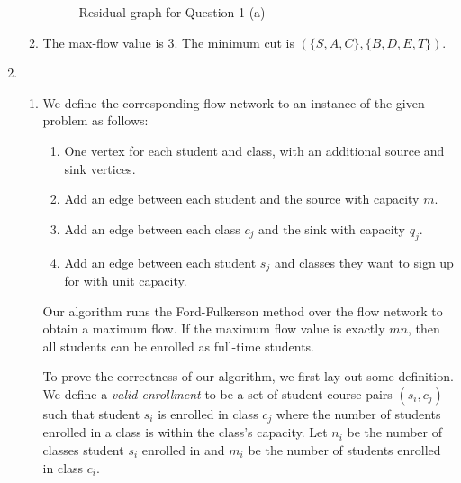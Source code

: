 \documentclass{article}
\begin{document}
\begin{enumerate}
\begin{enumerate}
\begin{figure}[ht]
            \caption{Residual graph for Question 1 (a)}
            \label{fig:1a}
        \end{figure}
        
        \item The max-flow value is 3. The minimum cut is $(\{S, A, C\}, \{B, D, E, T\})$.
    \end{enumerate}

    \item
    \begin{enumerate}
        \item We define the corresponding flow network to an instance of the given problem as follows:
        \begin{enumerate}
            \item One vertex for each student and class, with an additional source and sink vertices.
            \item Add an edge between each student and the source with capacity $m$.
            \item Add an edge between each class $c_j$ and the sink with capacity $q_j$.
            \item Add an edge between each student $s_j$ and classes they want to sign up for with unit capacity.
        \end{enumerate}

        Our algorithm runs the Ford-Fulkerson method over the flow network to obtain a maximum flow. If the maximum flow value is exactly $mn$, then all students can be enrolled as full-time students.

        To prove the correctness of our algorithm, we first lay out some definition. We define a \emph{valid enrollment} to be a set of student-course pairs $(s_i, c_j)$ such that student $s_i$ is enrolled in class $c_j$ where the number of students enrolled in a class is within the class's capacity. Let $n_i$ be the number of classes student $s_i$ enrolled in and $m_i$ be the number of students enrolled in class $c_i$.
        

\end{enumerate}
\end{enumerate}
\end{document}
